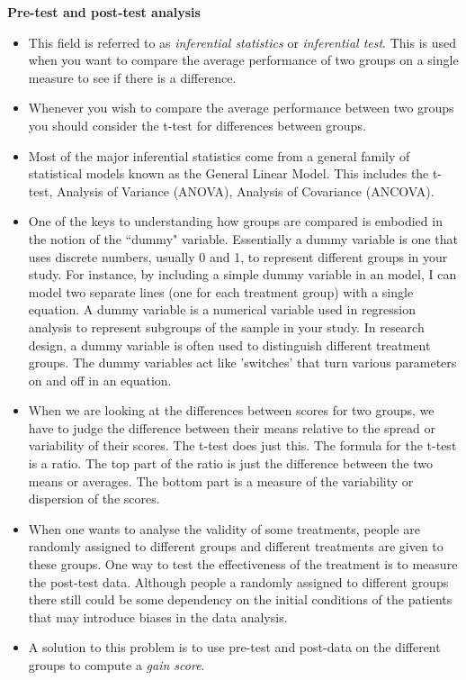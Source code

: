 \documentclass[hidelinks,11pt,a4paper]{report}
\begin{document}
\noindent \textbf{Pre-test and post-test analysis}

\begin{itemize}
\item This field is referred to as \emph{inferential statistics} or \emph{inferential test}. This is used when you want to compare the average performance of two groups on a single measure to see if there is a difference.
\item Whenever you wish to compare the average performance between two groups you should consider the t-test for differences between groups.
\item Most of the major inferential statistics come from a general family of statistical models known as the General Linear Model. This includes the t-test, Analysis of Variance (ANOVA), Analysis of Covariance (ANCOVA).
\item One of the keys to understanding how groups are compared is embodied in the notion of the ``dummy" variable. Essentially a dummy variable is one that uses discrete numbers, usually 0 and 1, to represent different groups in your study. For instance, by including a simple dummy variable in an model, I can model two separate lines (one for each treatment group) with a single equation. A dummy variable is a numerical variable used in regression analysis to represent subgroups of the sample in your study. In research design, a dummy variable is often used to distinguish different treatment groups. The dummy variables act like 'switches' that turn various parameters on and off in an equation.
\item When we are looking at the differences between scores for two groups, we have to judge the difference between their means relative to the spread or variability of their scores. The t-test does just this. The formula for the t-test is a ratio. The top part of the ratio is just the difference between the two means or averages. The bottom part is a measure of the variability or dispersion of the scores. 
\item When one wants to analyse the validity of some treatments, people are randomly assigned to different groups and different treatments are given to these groups. One way to test the effectiveness of the treatment is to measure the post-test data. Although people a randomly assigned to different groups there still could be some dependency on the initial conditions of the patients that may introduce biases in the data analysis.
\item A solution to this problem is to use pre-test and post-data on the different groups to compute a \emph{gain score}.

\end{itemize}
\end{document}
